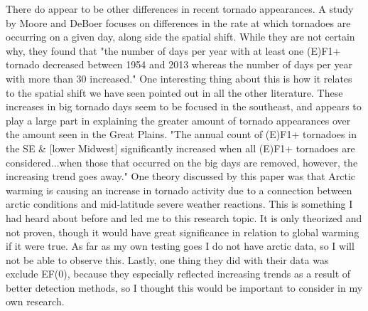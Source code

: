 \documentclass[12pt,english]{article}
\begin{document}
There do appear to be other differences in recent tornado appearances. A study by Moore and DeBoer focuses on differences in the rate at which tornadoes are occurring on a given day, along side the spatial shift. While they are not certain why, they found that "the number of days per year with at least one (E)F1+ tornado decreased between 1954 and 2013 whereas the number of days per year with more than 30 increased."\cite{Moore2019} One interesting thing about this is how it relates to the spatial shift we have seen pointed out in all the other literature. These increases in big tornado days seem to be focused in the southeast, and appears to play a large part in explaining the greater amount of tornado appearances over the amount seen in the Great Plains. "The annual count of (E)F1+ tornadoes in the SE \& [lower Midwest] significantly increased when all (E)F1+ tornadoes are considered...when those that occurred on the big days are removed, however, the increasing trend goes away."\cite{Moore2019} One theory discussed by this paper was that Arctic warming is causing an increase in tornado activity due to a connection between arctic conditions and mid-latitude severe weather reactions. This is something I had heard about before and led me to this research topic. It is only theorized and not proven, though it would have great significance in relation to global warming if it were true. As far as my own testing goes I do not have arctic data, so I will not be able to observe this. Lastly, one thing they did with their data was exclude EF(0), because they especially reflected increasing trends as a result of better detection methods, so I thought this would be important to consider in my own research. 
    
\end{document}
